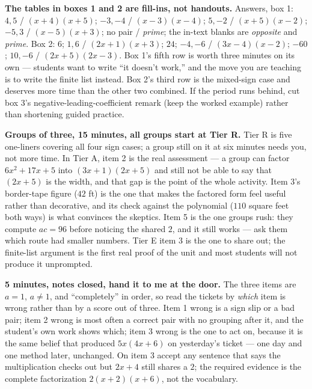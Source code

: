 \documentclass[10pt]{article}
\begin{document}
\begin{teachernote}
    \textbf{The tables in boxes 1 and 2 are fill-ins, not handouts.} Answers, box 1: $4, 5$ /
    $(x+4)(x+5)$; $-3, -4$ / $(x-3)(x-4)$; $5, -2$ / $(x+5)(x-2)$; $-5, 3$ / $(x-5)(x+3)$; no pair /
    \emph{prime}; the in-text blanks are \emph{opposite} and \emph{prime}. Box 2: $6$; $1, 6$ /
    $(2x+1)(x+3)$; $24$; $-4, -6$ / $(3x-4)(x-2)$; $-60$; $10, -6$ / $(2x+5)(2x-3)$. Box 1's fifth
    row is worth three minutes on its own --- students want to write ``it doesn't work,'' and the
    move you are teaching is to write the finite list instead. Box 2's third row is the mixed-sign
    case and deserves more time than the other two combined. If the period runs behind, cut box 3's
    negative-leading-coefficient remark (keep the worked example) rather than shortening guided
    practice.
\end{teachernote}

\begin{teachernote}
    \textbf{Groups of three, 15 minutes, all groups start at Tier R.} Tier R is five one-liners
    covering all four sign cases; a group still on it at six minutes needs you, not more time. In
    Tier A, item 2 is the real assessment --- a group can factor $6x^2+17x+5$ into $(3x+1)(2x+5)$
    and still not be able to say that $(2x+5)$ is the width, and that gap is the point of the whole
    activity. Item 3's border-tape figure ($42$ ft) is the one that makes the factored form feel
    useful rather than decorative, and its check against the polynomial ($110$ square feet both
    ways) is what convinces the skeptics. Item 5 is the one groups rush: they compute $ac=96$ before
    noticing the shared $2$, and it still works --- ask them which route had smaller numbers. Tier E
    item 3 is the one to share out; the finite-list argument is the first real proof of the unit and
    most students will not produce it unprompted.
\end{teachernote}

\begin{teachernote}
    \textbf{5 minutes, notes closed, hand it to me at the door.} The three items are $a=1$,
    $a \ne 1$, and ``completely'' in order, so read the tickets by \emph{which} item is wrong rather
    than by a score out of three. Item 1 wrong is a sign slip or a bad pair; item 2 wrong is most
    often a correct pair with no grouping after it, and the student's own work shows which; item 3
    wrong is the one to act on, because it is the same belief that produced $5x(4x+6)$ on
    yesterday's ticket --- one day and one method later, unchanged. On item 3 accept any sentence
    that says the multiplication checks out but $2x+4$ still shares a $2$; the required evidence is
    the complete factorization $2(x+2)(x+6)$, not the vocabulary.
\end{teachernote}
\end{document}
